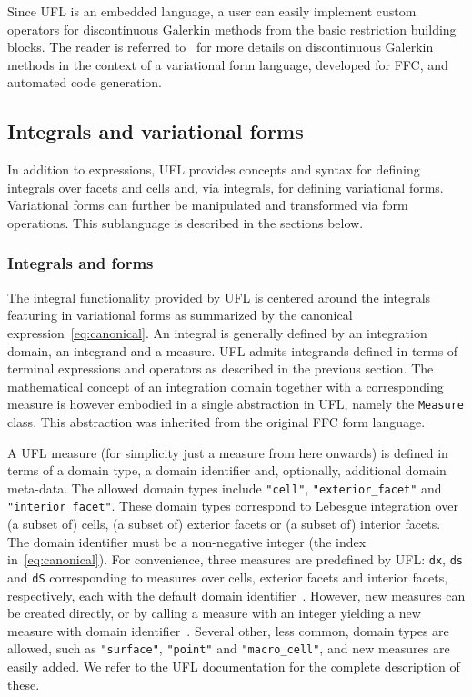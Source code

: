 \documentclass[prodmode,acmtoms]{acmsmall}
\newcommand{\uflc}[1]{\texttt{#1}}
\begin{document}
Since UFL is an embedded language, a user can easily implement custom
operators for discontinuous Galerkin methods from the basic
restriction building blocks. The reader is referred
to~\citet{oelgaard:2008} for more details on discontinuous Galerkin
methods in the context of a variational form language, developed for
FFC, and automated code generation.

\subsection{Integrals and variational forms}
\label{sec:forms}

In addition to expressions, UFL provides concepts and syntax for
defining integrals over facets and cells and, via integrals, for
defining variational forms. Variational forms can further be
manipulated and transformed via form operations. This sublanguage is
described in the sections below.

\subsubsection{Integrals and forms}

The integral functionality provided by UFL is centered around the
integrals featuring in variational forms as summarized by the
canonical expression~\eqref{eq:canonical}. An integral is generally
defined by an integration domain, an integrand and a measure. UFL
admits integrands defined in terms of terminal expressions and
operators as described in the previous section. The mathematical
concept of an integration domain together with a corresponding measure
is however embodied in a single abstraction in UFL, namely the
\uflc{Measure} class. This abstraction was inherited from the
original FFC form language.

A UFL measure (for simplicity just a measure from here onwards) is
defined in terms of a domain type, a domain identifier and,
optionally, additional domain meta-data. The allowed domain types
include \uflc{"cell"}, \uflc{"exterior\_facet"} and
\uflc{"interior\_facet"}. These domain types correspond to Lebesgue
integration over (a subset of) cells, (a subset of) exterior facets or
(a subset of) interior facets.  The domain identifier must be a
non-negative integer (the index~ in~\eqref{eq:canonical}). For
convenience, three measures are predefined by UFL: \uflc{dx},
\uflc{ds} and \uflc{dS} corresponding to measures over cells,
exterior facets and interior facets, respectively, each with the
default domain identifier~. However, new measures can be created
directly, or by calling a measure with an integer  yielding a new
measure with domain identifier~. Several other, less common, domain
types are allowed, such as \uflc{"surface"}, \uflc{"point"} and
\uflc{"macro\_cell"}, and new measures are easily added. We refer to
the UFL documentation for the complete description of these.
\end{document}
